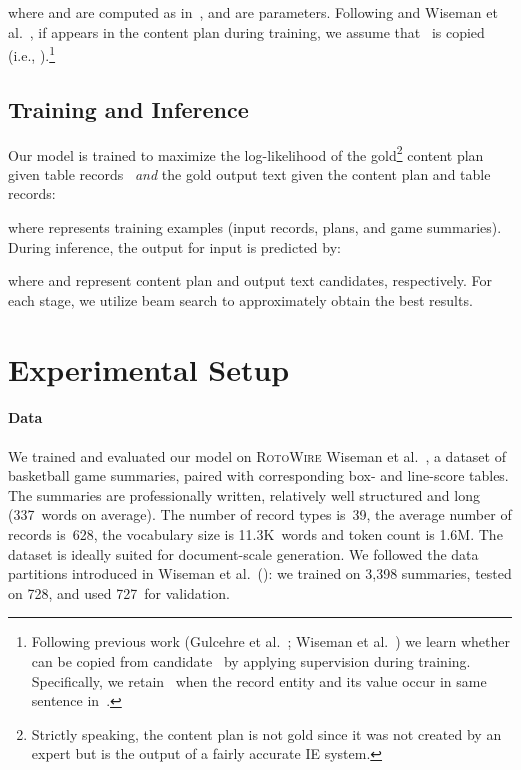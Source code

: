\documentclass[letterpaper]{article} \usepackage{aaai19}  \usepackage{times}  \usepackage{helvet}  \usepackage{courier}  \usepackage{url}  \usepackage{graphicx}  \frenchspacing  \setlength{\pdfpagewidth}{8.5in}  \setlength{\pdfpageheight}{11in}  \graphicspath{ {images/} }
\begin{document}
where  and  are computed as
in~, and  are parameters.  Following
\citeauthor{P16-1014}  and
Wiseman et al.~,
if  appears in the content plan during training, we assume that
~is copied (i.e., ).\footnote{Following previous work
  (Gulcehre et al.~\citeyear{P16-1014}; Wiseman et
  al.~\citeyear{wiseman2017challenges}) we learn whether  can be
  copied from candidate~ by applying supervision during
  training. Specifically, we retain~ when the record
  entity and its value occur in same sentence in~.}


\subsection{Training and Inference}
Our model is trained to maximize the log-likelihood of the
gold\footnote{Strictly speaking, the content plan is not gold since it
  was not created by an expert but is the output of a fairly accurate
  IE system.}  content plan given table records~ \emph{and} the
gold output text given the content plan and table records:

where  represents training examples (input records,
plans, and game summaries). During inference, the output for input 
is predicted by:

where  and  represent content plan and output text candidates,
respectively. For each stage, we utilize beam search to approximately
obtain the best results.


\section{Experimental Setup}
\label{sec:experimental-setup}

\paragraph{Data}
We trained and evaluated our model on \textsc{RotoWire} Wiseman et
al.~, a dataset of basketball game
summaries, paired with corresponding box- and line-score tables. The
summaries are professionally written, relatively well structured and
long (337~words on average). The number of record types is~39, the
average number of records is~628, the vocabulary size is 11.3K~words
and token count is 1.6M. The dataset is ideally suited for
document-scale generation.  We followed the data partitions introduced
in Wiseman et al.~(\citeyear{wiseman2017challenges}): we trained on
3,398 summaries, tested on 728, and used 727~for validation.
\end{document}
